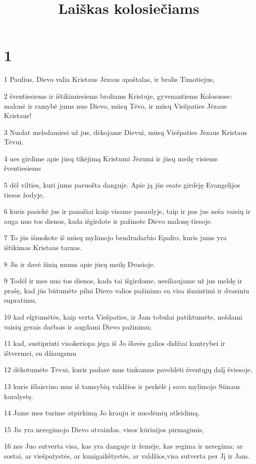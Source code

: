 

\title{Laiškas kolosiečiams}

\chapter{1}


\par 1 Paulius, Dievo valia Kristaus Jėzaus apaštalas, ir brolis Timotiejus,­ 
\par 2 šventiesiems ir ištikimiesiems broliams Kristuje, gyvenantiems Kolosuose: malonė ir ramybė jums nuo Dievo, mūsų Tėvo, ir mūsų Viešpaties Jėzaus Kristaus! 
\par 3 Nuolat melsdamiesi už jus, dėkojame Dievui, mūsų Viešpaties Jėzaus Kristaus Tėvui, 
\par 4 nes girdime apie jūsų tikėjimą Kristumi Jėzumi ir jūsų meilę visiems šventiesiems 
\par 5 dėl vilties, kuri jums paruošta danguje. Apie ją jūs esate girdėję Evangelijos tiesos žodyje, 
\par 6 kuris pasiekė jus ir panašiai kaip visame pasaulyje, taip ir pas jus neša vaisių ir auga nuo tos dienos, kada išgirdote ir pažinote Dievo malonę tiesoje. 
\par 7 To jūs išmokote iš mūsų mylimojo bendradarbio Epafro, kuris jums yra ištikimas Kristaus tarnas. 
\par 8 Jis ir davė žinią mums apie jūsų meilę Dvasioje. 
\par 9 Todėl ir mes nuo tos dienos, kada tai išgirdome, nesiliaujame už jus meldę ir prašę, kad jūs būtumėte pilni Dievo valios pažinimo su visa išmintimi ir dvasiniu supratimu, 
\par 10 kad elgtumėtės, kaip verta Viešpaties, ir Jam tobulai patiktumėte, nešdami vaisių gerais darbais ir augdami Dievo pažinimu; 
\par 11 kad, sustiprinti visokeriopa jėga iš Jo šlovės galios didžiai kantrybei ir ištvermei, su džiaugsmu 
\par 12 dėkotumėte Tėvui, kuris padarė mus tinkamus paveldėti šventųjų dalį šviesoje, 
\par 13 kuris išlaisvino mus iš tamsybių valdžios ir perkėlė į savo mylimojo Sūnaus karalystę. 
\par 14 Jame mes turime atpirkimą Jo krauju ir nuodėmių atleidimą. 
\par 15 Jis yra neregimojo Dievo atvaizdas, visos kūrinijos pirmagimis, 
\par 16 nes Juo sutverta visa, kas yra danguje ir žemėje, kas regima ir neregima; ar sostai, ar viešpatystės, ar kunigaikštystės, ar valdžios,­visa sutverta per Jį ir Jam. 
